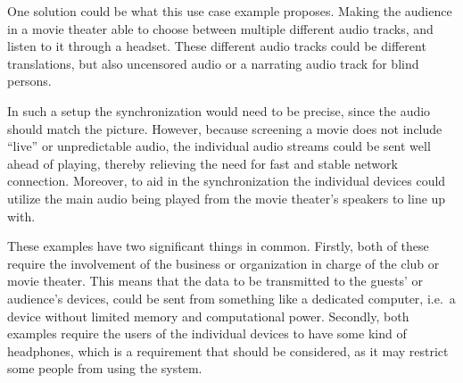 \begin{description}
        One solution could be what this use case example proposes.
        Making the audience in a movie theater able to choose between multiple different audio tracks, and listen to it through a headset.
        These different audio tracks could be different translations, but also uncensored audio or a narrating audio track for blind persons.

        In such a setup the synchronization would need to be precise, since the audio should match the picture.
        However, because screening a movie does not include \enquote{live} or unpredictable audio, the individual audio streams could be sent well ahead of playing,
        thereby relieving the need for fast and stable network connection.
        Moreover, to aid in the synchronization the individual devices could utilize the main audio being played from the movie theater's speakers to line up with.
\end{description}

These examples have two significant things in common.
Firstly, both of these require the involvement of the business or organization in charge of the club or movie theater.
This means that the data to be transmitted to the guests' or audience's devices, could be sent from something like a dedicated computer, i.e.~a device without limited memory and computational power.
Secondly, both examples require the users of the individual devices to have some kind of headphones, which is a requirement that should be considered, as it may restrict some people from using the system.
